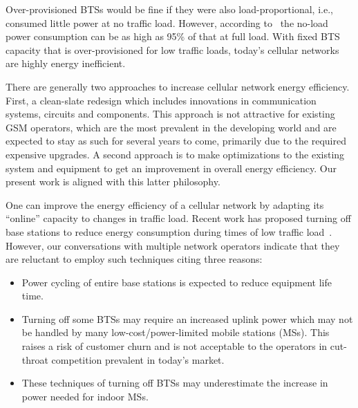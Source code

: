 Over-provisioned BTSs would be fine if they were also
load-proportional, i.e., consumed little power at no traffic
load. However, according to~\cite{Peng:2011:BTSSaving:Mobicom}
the no-load power consumption can be as high as 95\% of that at
full load. With fixed BTS capacity that is over-provisioned for
low traffic loads, today's cellular networks are highly energy inefficient.

There are generally two approaches to increase cellular network
energy efficiency. First, a clean-slate redesign which includes
innovations in communication systems, circuits and components.
This approach is not attractive for existing GSM operators,
which are the most prevalent in the developing world and are
expected to stay as such for several years to come, primarily due to the required expensive upgrades. 
A second approach is to make optimizations to the existing system
and equipment to get an improvement in overall energy
efficiency. Our present work is aligned with this latter
philosophy.

One can improve the energy efficiency of a cellular network by
adapting its ``online'' capacity to changes in traffic load.
Recent work has proposed turning off base stations to reduce
energy consumption during times of low traffic
load~\cite{Louhi:2007:BTSPower:INTELEC,Oh:Comm:2011,Peng:2011:BTSSaving:Mobicom,He:CellularPower:JN:2012}.
However, our conversations with multiple network operators
indicate that they are reluctant to employ such techniques
citing three reasons:
\begin{itemize}
\item Power cycling of entire base stations is expected to
    reduce equipment life time.
\item Turning off some BTSs may require an increased uplink
    power which may not be handled by many low-cost/power-limited mobile
    stations (MSs). This raises a risk of customer churn and is
    not acceptable to the operators in cut-throat
    competition prevalent in today's market.
\item These techniques of turning off BTSs may
    underestimate the increase in power needed for indoor
    MSs.
\end{itemize}


